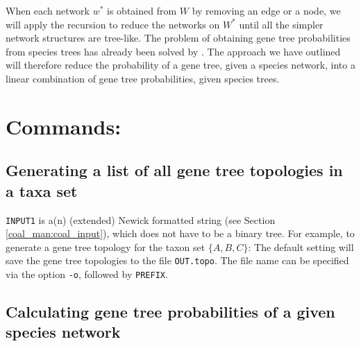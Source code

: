 When each network $w^*$ is obtained from $W$ by removing an edge or a node, we will apply the recursion to reduce the networks on $W^*$ until all the simpler network structures are tree-like. The problem of obtaining gene tree probabilities from species trees has already been solved by \cite{Degnan2005}. The approach we have outlined will therefore reduce the probability of a gene tree, given a species network, into a linear combination of gene tree probabilities, given species trees.


\section{Commands:}
\subsection{Generating a list of all gene tree topologies in a taxa set}
{\tt INPUT1} is a(n) (extended) Newick formatted string (see Section \ref{coal_man:coal_input}), which does not have to be a binary tree. For example, to generate a gene tree topology for the taxon set $\{A,B,C\}$:
The default setting will save the gene tree topologies to the file {\tt OUT.topo}. The file name can be specified via the option {\tt -o}, followed by {\tt PREFIX}.


\subsection{Calculating gene tree probabilities of a given species network}

